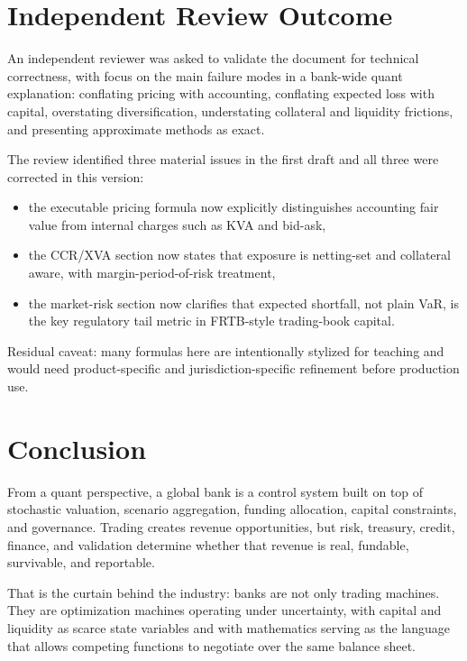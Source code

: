 \documentclass{apex_mdd}
\begin{document}
\section{Independent Review Outcome}

An independent reviewer was asked to validate the document for technical correctness, with focus on the main failure modes in a bank-wide quant explanation: conflating pricing with accounting, conflating expected loss with capital, overstating diversification, understating collateral and liquidity frictions, and presenting approximate methods as exact.

The review identified three material issues in the first draft and all three were corrected in this version:
\begin{itemize}
  \item the executable pricing formula now explicitly distinguishes accounting fair value from internal charges such as KVA and bid-ask,
  \item the CCR/XVA section now states that exposure is netting-set and collateral aware, with margin-period-of-risk treatment,
  \item the market-risk section now clarifies that expected shortfall, not plain VaR, is the key regulatory tail metric in FRTB-style trading-book capital.
\end{itemize}

Residual caveat: many formulas here are intentionally stylized for teaching and would need product-specific and jurisdiction-specific refinement before production use.

\section{Conclusion}

From a quant perspective, a global bank is a control system built on top of stochastic valuation, scenario aggregation, funding allocation, capital constraints, and governance. Trading creates revenue opportunities, but risk, treasury, credit, finance, and validation determine whether that revenue is real, fundable, survivable, and reportable.

That is the curtain behind the industry: banks are not only trading machines. They are optimization machines operating under uncertainty, with capital and liquidity as scarce state variables and with mathematics serving as the language that allows competing functions to negotiate over the same balance sheet.
\end{document}
